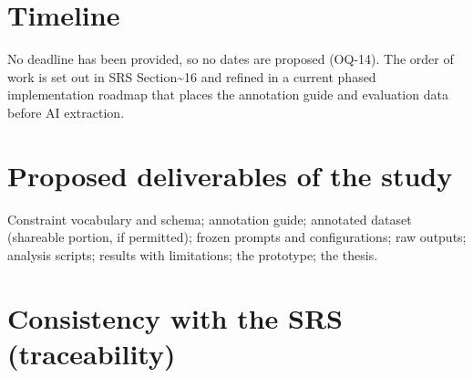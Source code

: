 \documentclass[
  11pt,a4paper,oneside]{report}
\begin{document}
\hypertarget{timeline}{%
\section{Timeline}\label{timeline}}

No deadline has been provided, so no dates are proposed (OQ-14). The
order of work is set out in SRS Section\textasciitilde16 and refined in a
current phased implementation roadmap that places
the annotation guide and evaluation data before AI extraction.

\hypertarget{proposed-deliverables-of-the-study}{%
\section{Proposed deliverables of the
study}\label{proposed-deliverables-of-the-study}}

Constraint vocabulary and schema; annotation guide; annotated dataset
(shareable portion, if permitted); frozen prompts and configurations;
raw outputs; analysis scripts; results with limitations; the prototype;
the thesis.

\hypertarget{consistency-with-the-srs-traceability}{%
\section{Consistency with the SRS
(traceability)}\label{consistency-with-the-srs-traceability}}
\end{document}
